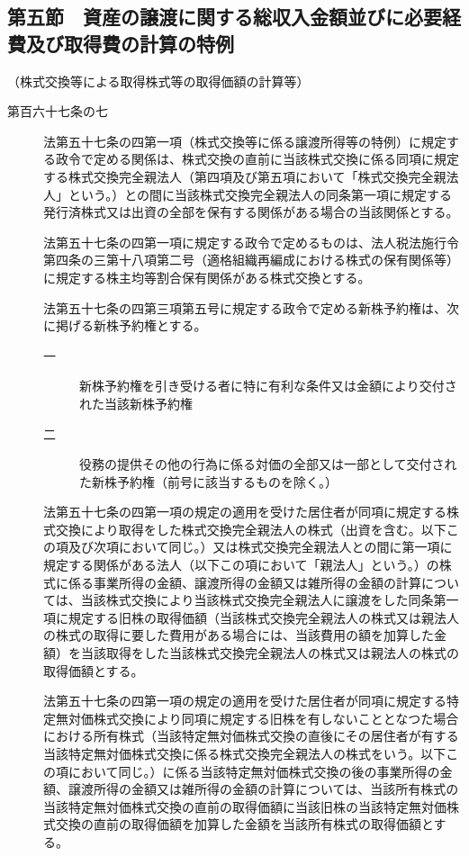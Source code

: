\documentclass[twocolumn,a4j,10pt]{ltjtarticle}
\begin{document}
\subsection*{第五節　資産の譲渡に関する総収入金額並びに必要経費及び取得費の計算の特例}
\noindent\hspace{10pt}（株式交換等による取得株式等の取得価額の計算等）
\begin{description}
\item[第百六十七条の七]法第五十七条の四第一項（株式交換等に係る譲渡所得等の特例）に規定する政令で定める関係は、株式交換の直前に当該株式交換に係る同項に規定する株式交換完全親法人（第四項及び第五項において「株式交換完全親法人」という。）との間に当該株式交換完全親法人の同条第一項に規定する発行済株式又は出資の全部を保有する関係がある場合の当該関係とする。
\item[]法第五十七条の四第一項に規定する政令で定めるものは、法人税法施行令第四条の三第十八項第二号（適格組織再編成における株式の保有関係等）に規定する株主均等割合保有関係がある株式交換とする。
\item[]法第五十七条の四第三項第五号に規定する政令で定める新株予約権は、次に掲げる新株予約権とする。
\begin{description}
\item[一]新株予約権を引き受ける者に特に有利な条件又は金額により交付された当該新株予約権
\item[二]役務の提供その他の行為に係る対価の全部又は一部として交付された新株予約権（前号に該当するものを除く。）
\end{description}
\item[]法第五十七条の四第一項の規定の適用を受けた居住者が同項に規定する株式交換により取得をした株式交換完全親法人の株式（出資を含む。以下この項及び次項において同じ。）又は株式交換完全親法人との間に第一項に規定する関係がある法人（以下この項において「親法人」という。）の株式に係る事業所得の金額、譲渡所得の金額又は雑所得の金額の計算については、当該株式交換により当該株式交換完全親法人に譲渡をした同条第一項に規定する旧株の取得価額（当該株式交換完全親法人の株式又は親法人の株式の取得に要した費用がある場合には、当該費用の額を加算した金額）を当該取得をした当該株式交換完全親法人の株式又は親法人の株式の取得価額とする。
\item[]法第五十七条の四第一項の規定の適用を受けた居住者が同項に規定する特定無対価株式交換により同項に規定する旧株を有しないこととなつた場合における所有株式（当該特定無対価株式交換の直後にその居住者が有する当該特定無対価株式交換に係る株式交換完全親法人の株式をいう。以下この項において同じ。）に係る当該特定無対価株式交換の後の事業所得の金額、譲渡所得の金額又は雑所得の金額の計算については、当該所有株式の当該特定無対価株式交換の直前の取得価額に当該旧株の当該特定無対価株式交換の直前の取得価額を加算した金額を当該所有株式の取得価額とする。

\end{description}
\end{document}
